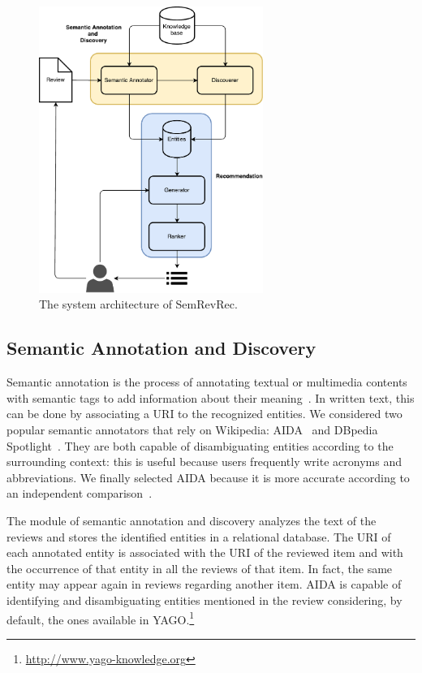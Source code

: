\begin{figure}
\centering
\includegraphics[width=0.65\textwidth]{architecture}
\caption[SemRevRec architecture]{The system architecture of SemRevRec.}
\label{srr:fig:arch}
\end{figure}

\subsection{Semantic Annotation and Discovery}
\label{srr:sec:annotation}

Semantic annotation is the process of annotating textual or multimedia contents with semantic tags to add information about their meaning~\cite{Saathoff2010}. In written text, this can be done by associating a URI to the recognized entities. We considered two popular semantic annotators that rely on Wikipedia: AIDA~\cite{Hoffart2011} and DBpedia Spotlight~\cite{Daiber2013}. They are both capable of disambiguating entities according to the surrounding context: this is useful because users frequently write acronyms and abbreviations. We finally selected AIDA because it is more accurate according to an independent comparison~\cite{Gangemi2013}.

The module of semantic annotation and discovery analyzes the text of the reviews and stores the identified entities in a relational database. The URI of each annotated entity is associated with the URI of the reviewed item and with the occurrence of that entity in all the reviews of that item. In fact, the same entity may appear again in reviews regarding another item. AIDA is capable of identifying and disambiguating entities mentioned in the review considering, by default, the ones available in YAGO.\footnote{\url{http://www.yago-knowledge.org}}

